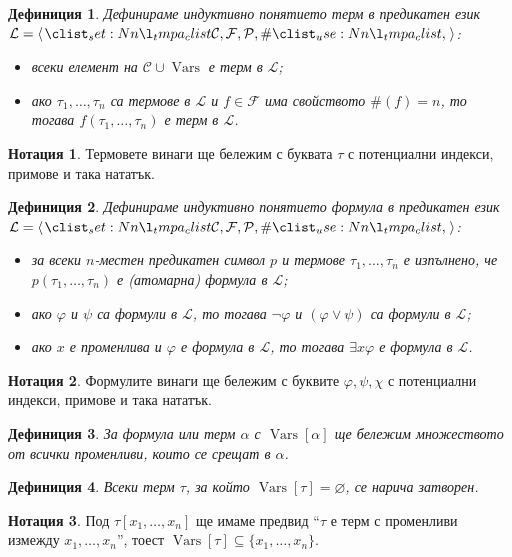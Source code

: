 \documentclass[12pt]{article}
\newcommand{\vars}{\operatorname{Vars}}
\newcommand{\calL}{\mathcal{L}}
\newcommand{\calF}{\mathcal{F}}
\newcommand{\calP}{\mathcal{P}}
\newcommand{\calC}{\mathcal{C}}
\newtheorem*{definition}{Дефиниция}
\theoremstyle{definition}
\newtheorem*{notation}{Нотация}
\begin{document}
\begin{definition}
	Дефинираме индуктивно понятието терм в предикатен език $\calL = \opair{\calC, \calF, \calP, \#}$:
	\begin{itemize}
		\item всеки елемент на $\calC \cup \vars$ е терм в $\calL$;
		\item ако $\tau_1, \dots, \tau_n$ са термове в $\calL$ и $f \in \calF$ има свойството $\#(f) = n$, то тогава $f(\tau_1, \dots, \tau_n)$ е терм в $\calL$.
	\end{itemize}
\end{definition}

\begin{notation}
	Термовете винаги ще бележим с буквата $\tau$ с потенциални индекси, примове и така нататък.
\end{notation}

\begin{definition}
	Дефинираме индуктивно понятието формула в предикатен език $\calL = \opair{\calC, \calF, \calP, \#}$:
	\begin{itemize}
		\item за всеки $n$-местен предикатен символ $p$ и термове $\tau_1, \dots, \tau_n$ е изпълнено, че $p(\tau_1, \dots, \tau_n)$ е (атомарна) формула в $\calL$;
		\item ако $\varphi$ и $\psi$ са формули в $\calL$, то тогава $\neg \varphi$ и $(\varphi \lor \psi)$ са формули в $\calL$;
		\item ако $x$ е променлива и $\varphi$ е формула в $\calL$, то тогава $\exists x \varphi$ е формула в $\calL$.
	\end{itemize}
\end{definition}

\begin{notation}
	Формулите винаги ще бележим с буквите $\varphi, \psi, \chi$ с потенциални индекси, примове и така нататък.
\end{notation}

\begin{definition}
	За формула или терм $\alpha$ с $\vars[\alpha]$ ще бележим множеството от всички променливи, които се срещат в $\alpha$.
\end{definition}

\begin{definition}
	Всеки терм $\tau$, за който $\vars[\tau] = \varnothing$, се нарича затворен.
\end{definition}

\begin{notation}
	Под $\tau[x_1, \dots, x_n]$ ще имаме предвид ``$\tau$ е терм с променливи измежду $x_1, \dots, x_n$'', тоест $\vars[\tau] \subseteq \{ x_1, \dots, x_n \}$.
\end{notation}
\end{document}
